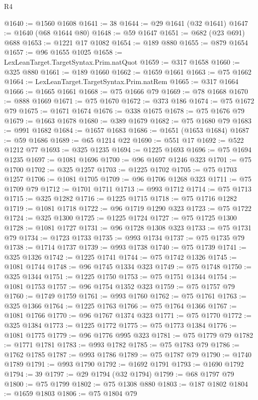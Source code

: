 \begin{lexlean}{R4}
\begin{coremodule}
{{{{{{{{{{{{{{{{{{{{{{{{{{{{{{{{{{{{{{{{{{{{{{{{{{{{{{{{{{{{{{{{{{{{{{{{{{{{{{{{{{{{{{{{{{{{@1640 := @1560 @1608
@1641 := 38
@1644 := @29 @1641 (@32 @1641)
@1647 := @1640 (@68 @1644 @80)
@1648 := @59 @1647
@1651 := @682 (@23 @691) @688
@1653 := @1221 @17 @1082
@1654 := @189 @880
@1655 := @879 @1654
@1657 := @96 @1655 @1025
@1658 := LexLeanTarget.TargetSyntax.Prim.natQuot
@1659 := @317 @1658
@1660 := @325 @880
@1661 := @189 @1660
@1662 := @1659 @1661
@1663 := @75 @1662
@1664 := LexLeanTarget.TargetSyntax.Prim.natRem
@1665 := @317 @1664
@1666 := @1665 @1661
@1668 := @75 @1666 @79
@1669 := @78 @1668
@1670 := @888 @1669
@1671 := @75 @1670
@1672 := @373 @186
@1674 := @75 @1672 @79
@1675 := @1671 @1674
@1676 := @338 @1675
@1678 := @75 @1676 @79
@1679 := @1663 @1678
@1680 := @389 @1679
@1682 := @75 @1680 @79
@1683 := @991 @1682
@1684 := @1657 @1683
@1686 := @1651 (@1653 @1684)
@1687 := @59 @1686
@1689 := @65 @1214 @22
@1690 := @551 @17
@1692 := @522 @1212 @77
@1693 := @325 @1235
@1694 := @1225 @1693
@1696 := @75 @1694 @1235
@1697 := @1081 @1696
@1700 := @96 @1697 @1246 @323
@1701 := @75 @1700
@1702 := @325 @1257
@1703 := @1225 @1702
@1705 := @75 @1703 @1257
@1706 := @1081 @1705
@1709 := @96 @1706 @1268 @323
@1711 := @75 @1709 @79
@1712 := @1701 @1711
@1713 := @993 @1712
@1714 := @75 @1713
@1715 := @325 @1282
@1716 := @1225 @1715
@1718 := @75 @1716 @1282
@1719 := @1081 @1718
@1722 := @96 @1719 @1290 @323
@1723 := @75 @1722
@1724 := @325 @1300
@1725 := @1225 @1724
@1727 := @75 @1725 @1300
@1728 := @1081 @1727
@1731 := @96 @1728 @1308 @323
@1733 := @75 @1731 @79
@1734 := @1723 @1733
@1735 := @993 @1734
@1737 := @75 @1735 @79
@1738 := @1714 @1737
@1739 := @993 @1738
@1740 := @75 @1739
@1741 := @325 @1326
@1742 := @1225 @1741
@1744 := @75 @1742 @1326
@1745 := @1081 @1744
@1748 := @96 @1745 @1334 @323
@1749 := @75 @1748
@1750 := @325 @1344
@1751 := @1225 @1750
@1753 := @75 @1751 @1344
@1754 := @1081 @1753
@1757 := @96 @1754 @1352 @323
@1759 := @75 @1757 @79
@1760 := @1749 @1759
@1761 := @993 @1760
@1762 := @75 @1761
@1763 := @325 @1366
@1764 := @1225 @1763
@1766 := @75 @1764 @1366
@1767 := @1081 @1766
@1770 := @96 @1767 @1374 @323
@1771 := @75 @1770
@1772 := @325 @1384
@1773 := @1225 @1772
@1775 := @75 @1773 @1384
@1776 := @1081 @1775
@1779 := @96 @1776 @995 @323
@1781 := @75 @1779 @79
@1782 := @1771 @1781
@1783 := @993 @1782
@1785 := @75 @1783 @79
@1786 := @1762 @1785
@1787 := @993 @1786
@1789 := @75 @1787 @79
@1790 := @1740 @1789
@1791 := @993 @1790
@1792 := @1692 @1791
@1793 := @1690 @1792
@1794 := 39
@1797 := @29 @1794 (@32 @1794)
@1799 := @68 @1797 @79
@1800 := @75 @1799
@1802 := @75 @1308 @880
@1803 := @187 @1802
@1804 := @1659 @1803
@1806 := @75 @1804 @79
}}}}}}}}}}}}}}}}}}}}}}}}}}}}}}}}}}}}}}}}}}}}}}}}}}}}}}}}}}}}}}}}}}}}}}}}}}}}}}}}}}}}}}}}}}}}
\end{coremodule}
\end{lexlean}
